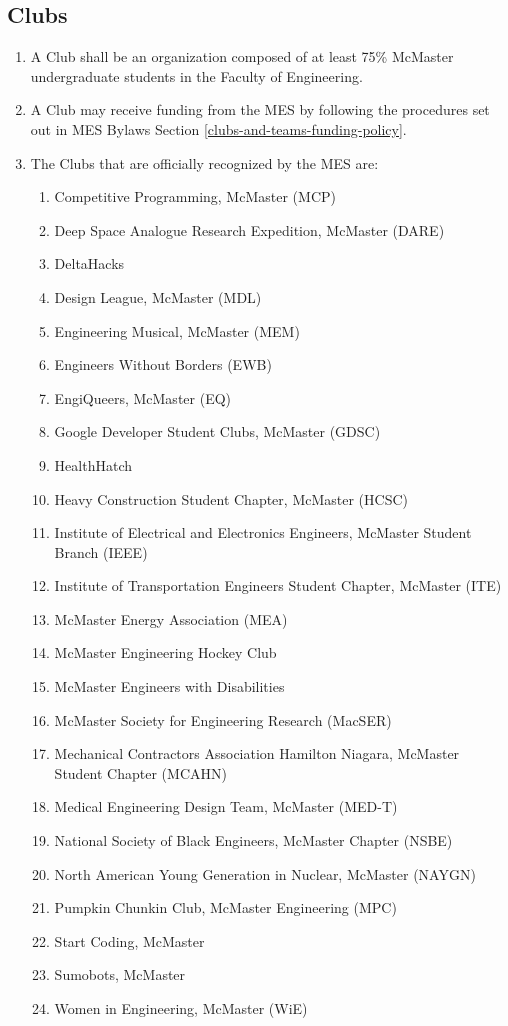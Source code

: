 \subsection{Clubs}
\label{clubs}
\begin{enumerate}
 \item
  A Club shall be an organization composed of at least 75\% McMaster undergraduate students in the Faculty of Engineering.
 \item
  A Club may receive funding from the MES by following the procedures set out in MES Bylaws Section \ref{clubs-and-teams-funding-policy}.
 \item
  The Clubs that are officially recognized by the MES are:

  \begin{enumerate}
   \item
    Competitive Programming, McMaster (MCP)
   \item
    Deep Space Analogue Research Expedition, McMaster (DARE)
   \item
    DeltaHacks
   \item
    Design League, McMaster (MDL)
   \item
    Engineering Musical, McMaster (MEM)
   \item
    Engineers Without Borders (EWB)
   \item
    EngiQueers, McMaster (EQ)
   \item
    Google Developer Student Clubs, McMaster (GDSC)
   \item
    HealthHatch
   \item
    Heavy Construction Student Chapter, McMaster (HCSC)
   \item
    Institute of Electrical and Electronics Engineers, McMaster Student Branch (IEEE)
   \item
    Institute of Transportation Engineers Student Chapter, McMaster (ITE)
   \item
    McMaster Energy Association (MEA)
   \item
    McMaster Engineering Hockey Club
   \item
    McMaster Engineers with Disabilities
   \item
    McMaster Society for Engineering Research (MacSER)
   \item
    Mechanical Contractors Association Hamilton Niagara, McMaster Student Chapter (MCAHN)
   \item
    Medical Engineering Design Team, McMaster (MED-T)
   \item
    National Society of Black Engineers, McMaster Chapter (NSBE)
   \item
    North American Young Generation in Nuclear, McMaster (NAYGN)
   \item
    Pumpkin Chunkin Club, McMaster Engineering (MPC)
   \item
    Start Coding, McMaster
   \item 
    Sumobots, McMaster
   \item
    Women in Engineering, McMaster (WiE)
  \end{enumerate}
\end{enumerate}

